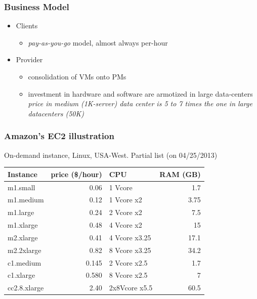 \documentclass[bigger,hyperref={colorlinks=true, urlcolor=red, plainpages=false, pdfpagelabels, bookmarksnumbered}]{beamer}
\begin{document}
\begin{frame}
\frametitle{Business Model}
\label{sec-2-5}
\begin{itemize}

\item Clients
\label{sec-2-5-1}%
\begin{itemize}
\item \emph{pay-as-you-go} model, almost always per-hour
\end{itemize}

\item Provider
\label{sec-2-5-2}%
\begin{itemize}
\item consolidation of VMs onto PMs
\item investment in hardware and software are armotized in large data-centers
      \emph{price in medium (1K-server) data center is 5 to 7 times the one in large datacenters (50K)}
\end{itemize}

\end{itemize} %
\end{frame}
\begin{frame}
\frametitle{Amazon's EC2 illustration}
\label{sec-2-6}


On-demand instance, Linux, USA-West. Partial list (on 04/25/2013)


\begin{center}
\begin{tabular}{lrlr}
 Instance      &  price (\$/hour)  &  CPU            &  RAM (GB)  \\
\hline
 m1.small      &             0.06  &  1 Vcore        &       1.7  \\
 m1.medium     &             0.12  &  1 Vcore x2     &      3.75  \\
 m1.large      &             0.24  &  2 Vcore x2     &       7.5  \\
 m1.xlarge     &             0.48  &  4 Vcore x2     &        15  \\
\hline
 m2.xlarge     &             0.41  &  4 Vcore x3.25  &      17.1  \\
 m2.2xlarge    &             0.82  &  8 Vcore x3.25  &      34.2  \\
\hline
 c1.medium     &            0.145  &  2 Vcore x2.5   &       1.7  \\
 c1.xlarge     &            0.580  &  8 Vcore x2.5   &         7  \\
\hline
 cc2.8.xlarge  &             2.40  &  2x8Vcore x5.5  &      60.5  \\
\hline
\end{tabular}
\end{center}
\end{frame}
\end{document}
